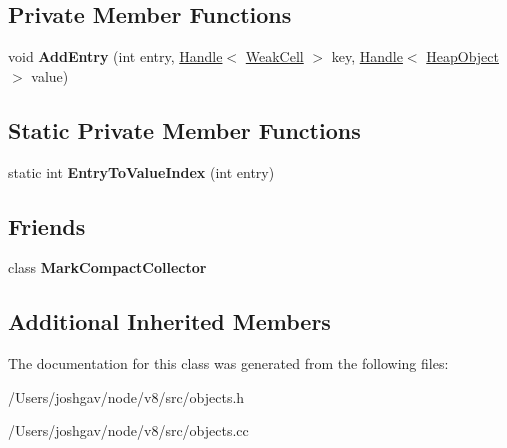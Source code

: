\subsection*{Private Member Functions}
\begin{DoxyCompactItemize}
\item 
void {\bfseries Add\+Entry} (int entry, \hyperlink{classv8_1_1internal_1_1_handle}{Handle}$<$ \hyperlink{classv8_1_1internal_1_1_weak_cell}{Weak\+Cell} $>$ key, \hyperlink{classv8_1_1internal_1_1_handle}{Handle}$<$ \hyperlink{classv8_1_1internal_1_1_heap_object}{Heap\+Object} $>$ value)\hypertarget{classv8_1_1internal_1_1_weak_hash_table_a381c156293e744e70ac3df07f7e34f24}{}\label{classv8_1_1internal_1_1_weak_hash_table_a381c156293e744e70ac3df07f7e34f24}

\end{DoxyCompactItemize}
\subsection*{Static Private Member Functions}
\begin{DoxyCompactItemize}
\item 
static int {\bfseries Entry\+To\+Value\+Index} (int entry)\hypertarget{classv8_1_1internal_1_1_weak_hash_table_a101369eeeee8fd0742b90b2714b0911c}{}\label{classv8_1_1internal_1_1_weak_hash_table_a101369eeeee8fd0742b90b2714b0911c}

\end{DoxyCompactItemize}
\subsection*{Friends}
\begin{DoxyCompactItemize}
\item 
class {\bfseries Mark\+Compact\+Collector}\hypertarget{classv8_1_1internal_1_1_weak_hash_table_ae585a96455613b2bc2ae3ea75a061d8b}{}\label{classv8_1_1internal_1_1_weak_hash_table_ae585a96455613b2bc2ae3ea75a061d8b}

\end{DoxyCompactItemize}
\subsection*{Additional Inherited Members}


The documentation for this class was generated from the following files\+:\begin{DoxyCompactItemize}
\item 
/\+Users/joshgav/node/v8/src/objects.\+h\item 
/\+Users/joshgav/node/v8/src/objects.\+cc\end{DoxyCompactItemize}

